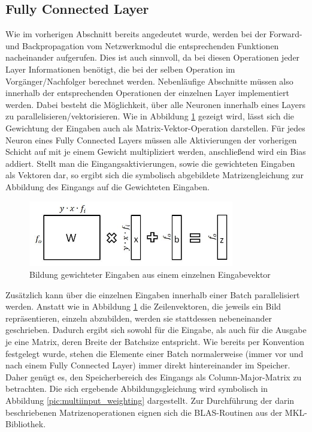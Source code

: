 \documentclass[../main.tex]{subfiles}
\begin{document}
\subsection{Fully Connected Layer}
Wie im vorherigen Abschnitt bereits angedeutet wurde, werden bei der Forward- und Backpropagation vom Netzwerkmodul die entsprechenden Funktionen nacheinander aufgerufen. Dies ist auch sinnvoll, da bei diesen Operationen jeder Layer Informationen benötigt, die bei der selben Operation im Vorgänger/Nachfolger berechnet werden. 
Nebenläufige Abschnitte müssen also innerhalb der entsprechenden Operationen der einzelnen Layer implementiert werden. Dabei besteht die Möglichkeit, über alle Neuronen innerhalb eines Layers zu parallelisieren/vektorisieren. Wie in Abbildung \ref{pic:singleinput_weighting} gezeigt wird, lässt sich die Gewichtung der Eingaben auch als Matrix-Vektor-Operation darstellen. Für jedes Neuron eines Fully Connected Layers müssen alle Aktivierungen der vorherigen Schicht auf mit je einem Gewicht multipliziert werden, anschließend wird ein Bias addiert. Stellt man die Eingangsaktivierungen, sowie die gewichteten Eingaben als Vektoren dar, so ergibt sich die symbolisch abgebildete Matrizengleichung zur Abbildung des Eingangs auf die Gewichteten Eingaben. 
\begin{figure}
	\centering 
	\includegraphics[width=0.8\textwidth]{../images/Schmidt/singleinput_weighting.jpg} 
	\caption {Bildung gewichteter Eingaben aus einem einzelnen Eingabevektor}
	\label{pic:singleinput_weighting} 
\end{figure} 
Zusätzlich kann über die einzelnen Eingaben innerhalb einer Batch parallelisiert werden. Anstatt wie in Abbildung \ref{pic:singleinput_weighting} die Zeilenvektoren, die jeweils ein Bild repräsentieren, einzeln abzubilden, werden sie stattdessen nebeneinander geschrieben. Dadurch ergibt sich sowohl für die Eingabe, als auch für die Ausgabe je eine Matrix, deren Breite der Batchsize entspricht. Wie bereits per Konvention festgelegt wurde, stehen die Elemente einer Batch normalerweise (immer vor und nach einem Fully Connected Layer) immer direkt hintereinander im Speicher. Daher genügt es, den Speicherbereich des Eingangs als Column-Major-Matrix zu betrachten. Die sich ergebende Abbildungsgleichung wird symbolisch in Abbildung \ref{pic:multiinput_weighting} dargestellt. Zur Durchführung der darin beschriebenen Matrizenoperationen eignen sich die BLAS-Routinen aus der MKL-Bibliothek. 
\end{document}
